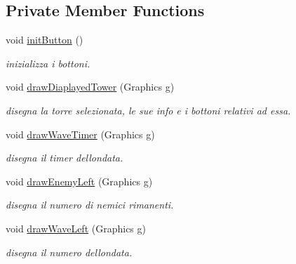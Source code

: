 \subsection*{Private Member Functions}
\begin{DoxyCompactItemize}
\item 
void \hyperlink{classui_1_1_action_bar_aed9fe7e919d4355a7ad86701d44e1fea}{init\+Button} ()
\begin{DoxyCompactList}\small\item\em inizializza i bottoni. \end{DoxyCompactList}\item 
void \hyperlink{classui_1_1_action_bar_a2177b06de4c0084e953665a7dbfd6772}{draw\+Diaplayed\+Tower} (Graphics g)
\begin{DoxyCompactList}\small\item\em disegna la torre selezionata, le sue info e i bottoni relativi ad essa. \end{DoxyCompactList}\item 
void \hyperlink{classui_1_1_action_bar_a01f37d59ae4977fa55a1a6dd3e8bd543}{draw\+Wave\+Timer} (Graphics g)
\begin{DoxyCompactList}\small\item\em disegna il timer dell\textquotesingle{}ondata. \end{DoxyCompactList}\item 
void \hyperlink{classui_1_1_action_bar_abb1fa26db5a1c2f4b0776a316ad85249}{draw\+Enemy\+Left} (Graphics g)
\begin{DoxyCompactList}\small\item\em disegna il numero di nemici rimanenti. \end{DoxyCompactList}\item 
void \hyperlink{classui_1_1_action_bar_aeb491734ea2c8ae2f1be9db4f930d22a}{draw\+Wave\+Left} (Graphics g)
\begin{DoxyCompactList}\small\item\em disegna il numero dell\textquotesingle{}ondata. \end{DoxyCompactList}\end{DoxyCompactItemize}
